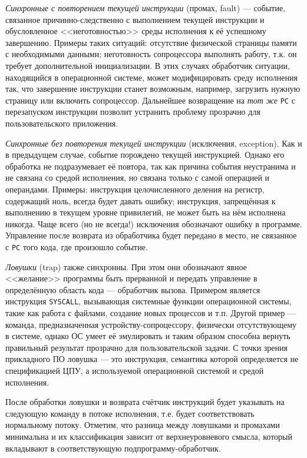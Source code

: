 \begin{itemize*}
    \item \textit{Синхронные с повторением текущей инструкции} (промах, \abbr fault) --- событие, связанное причинно-следственно с выполнением текущей инструкции и обусловленное <<неготовностью>> среды исполнения к её успешному завершению. Примеры таких ситуаций: отсутствие физической страницы памяти с необходимыми данными; неготовность сопроцессора выполнять работу, т.к. он требует дополнительной инициализации. В этих случаях обработчик ситуации, находящийся в операционной системе, может модифицировать среду исполнения так, что завершение инструкции станет возможным, например, загрузить нужную страницу или включить сопроцессор. Дальнейшее возвращение на \emph{тот же} \texttt{PC} с перезапуском инструкции позволит устранить проблему прозрачно для пользовательского приложения. 

    \item \textit{Синхронные без повторения текущей инструкции} (исключения, \abbr ex\-cep\-tion).  Как и в предыдущем случае, событие порождено текущей инструкцией. Однако его обработка не подразумевает её повтора, так как причина события неустранима и не связана со средой исполнения, но связана только с самой операцией и операндами. Примеры: инструкция целочисленного деления на регистр, содержащий ноль, всегда будет давать ошибку; инструкция, запрещённая к выполнению в текущем уровне привилегий, не может быть на нём исполнена никогда. Чаще всего (но не всегда!) исключения обозначают ошибку в программе. Управление после возврата из обработчика будет передано в место, не связанное с \texttt{PC} того кода, где произошло событие.

    \item \textit{Ловушки} (\abbr trap) также синхронны. При этом они обозначают явное <<желание>> программы быть прерванной и передать управление в определённую область кода --- обработчик вызова. Примером является инструкция \texttt{SYSCALL}, вызывающая системные функции операционной системы, такие как работа с файлами, создание новых процессов и т.п. Другой пример --- команда, предназначенная устройству-сопроцессору, физически отсутствующему в системе, однако ОС умеет её эмулировать и таким образом способна вернуть правильный результат прозрачно для пользовательской задачи. С точки зрения прикладного ПО ловушка --- это инструкция, семантика которой определяется не спецификацией ЦПУ, а используемой операционной системой и средой исполнения.

    После обработки ловушки и возврата счётчик инструкций будет указывать на следующую команду в потоке исполнения, т.е. будет соответствовать нормальному потоку. Отметим, что разница между ловушками и промахами минимальна и их классификация зависит от верхнеуровневого смысла, который вкладывают в соответствующую подпрограмму-обработчик.


\end{itemize*}
